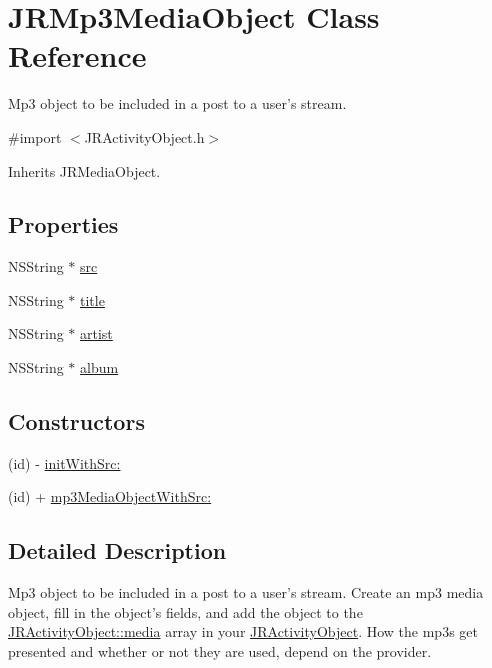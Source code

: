 \hypertarget{interface_j_r_mp3_media_object}{
\section{JRMp3MediaObject Class Reference}
\label{interface_j_r_mp3_media_object}
}


Mp3 object to be included in a post to a user's stream.  




{\ttfamily \#import $<$JRActivityObject.h$>$}



Inherits JRMediaObject.

\subsection*{Properties}
\begin{DoxyCompactItemize}
\item 
NSString $\ast$ \hyperlink{interface_j_r_mp3_media_object_ae6ae676c1841834aba74a2c5d11cb54c}{src}
\item 
NSString $\ast$ \hyperlink{interface_j_r_mp3_media_object_accd252e22f704fd4b314217317f0b5cb}{title}
\item 
NSString $\ast$ \hyperlink{interface_j_r_mp3_media_object_aa164b3ecc14b03d36f5093d3d4d7f5b1}{artist}
\item 
NSString $\ast$ \hyperlink{interface_j_r_mp3_media_object_adefc6578183aa09a492b229696f581df}{album}
\end{DoxyCompactItemize}
\subsection*{Constructors}
\label{_amgrp559a25fdb98a7d1fd1c3771ac568d5e9}
 \begin{DoxyCompactItemize}
\item 
(id) -\/ \hyperlink{interface_j_r_mp3_media_object_a15eba85b9094d28d8d9bc6b9625ee55c}{initWithSrc:}
\item 
(id) + \hyperlink{interface_j_r_mp3_media_object_ab8788e64a6d5b868e1b0689d55d68246}{mp3MediaObjectWithSrc:}
\end{DoxyCompactItemize}


\subsection{Detailed Description}
Mp3 object to be included in a post to a user's stream. Create an mp3 media object, fill in the object's fields, and add the object to the \hyperlink{interface_j_r_activity_object_a2e4ff78f83d0f353f8e0c17ed48ce0ab}{JRActivityObject::media} array in your \hyperlink{interface_j_r_activity_object}{JRActivityObject}. How the mp3s get presented and whether or not they are used, depend on the provider.

